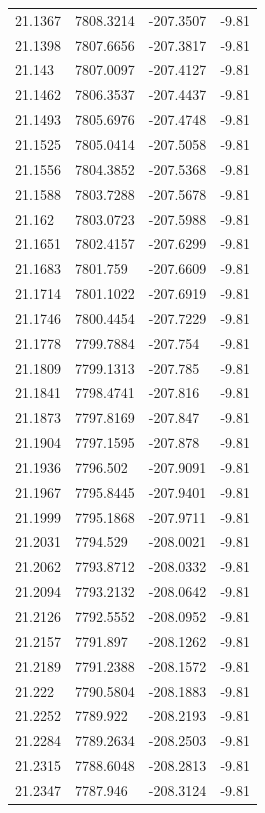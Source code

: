 \begin{table}[H]
\begin{tabular}{llll}
21.1367 & 7808.3214 & -207.3507 & -9.81 \\
21.1398 & 7807.6656 & -207.3817 & -9.81 \\
21.143 & 7807.0097 & -207.4127 & -9.81 \\
21.1462 & 7806.3537 & -207.4437 & -9.81 \\
21.1493 & 7805.6976 & -207.4748 & -9.81 \\
21.1525 & 7805.0414 & -207.5058 & -9.81 \\
21.1556 & 7804.3852 & -207.5368 & -9.81 \\
21.1588 & 7803.7288 & -207.5678 & -9.81 \\
21.162 & 7803.0723 & -207.5988 & -9.81 \\
21.1651 & 7802.4157 & -207.6299 & -9.81 \\
21.1683 & 7801.759 & -207.6609 & -9.81 \\
21.1714 & 7801.1022 & -207.6919 & -9.81 \\
21.1746 & 7800.4454 & -207.7229 & -9.81 \\
21.1778 & 7799.7884 & -207.754 & -9.81 \\
21.1809 & 7799.1313 & -207.785 & -9.81 \\
21.1841 & 7798.4741 & -207.816 & -9.81 \\
21.1873 & 7797.8169 & -207.847 & -9.81 \\
21.1904 & 7797.1595 & -207.878 & -9.81 \\
21.1936 & 7796.502 & -207.9091 & -9.81 \\
21.1967 & 7795.8445 & -207.9401 & -9.81 \\
21.1999 & 7795.1868 & -207.9711 & -9.81 \\
21.2031 & 7794.529 & -208.0021 & -9.81 \\
21.2062 & 7793.8712 & -208.0332 & -9.81 \\
21.2094 & 7793.2132 & -208.0642 & -9.81 \\
21.2126 & 7792.5552 & -208.0952 & -9.81 \\
21.2157 & 7791.897 & -208.1262 & -9.81 \\
21.2189 & 7791.2388 & -208.1572 & -9.81 \\
21.222 & 7790.5804 & -208.1883 & -9.81 \\
21.2252 & 7789.922 & -208.2193 & -9.81 \\
21.2284 & 7789.2634 & -208.2503 & -9.81 \\
21.2315 & 7788.6048 & -208.2813 & -9.81 \\
21.2347 & 7787.946 & -208.3124 & -9.81 \\

\end{tabular}
\end{table}
